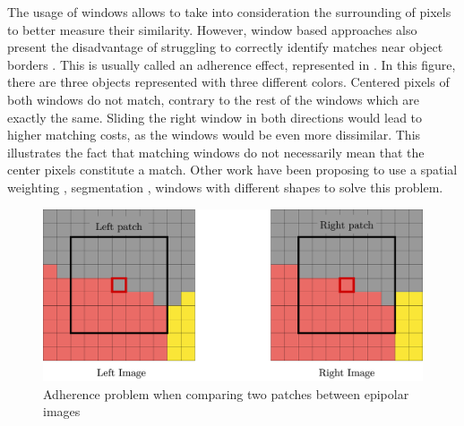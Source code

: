 The usage of windows allows to take into consideration the surrounding of pixels to better measure their similarity. However, window based approaches also present the disadvantage of struggling to correctly identify matches near object borders \cite{hirschmuller_real-time_2002}. This is usually called an adherence effect, represented in . In this figure, there are three objects represented with three different colors. Centered pixels of both windows do not match, contrary to the rest of the windows which are exactly the same. Sliding the right window in both directions would lead to higher matching costs, as the windows would be even more dissimilar. This illustrates the fact that matching windows do not necessarily mean that the center pixels constitute a match. Other work have been proposing to use a spatial weighting \cite{kuk-jin_yoon_locally_2005}, segmentation \cite{hutchison_segmentation-based_2007}, windows with different shapes \cite{ke_zhang_cross-based_2009, buades_reliable_2015} to solve this problem. 
\begin{figure}
	\centering
	\includegraphics[width=\linewidth]{Images/Chap_1/Adherence_window.png}
	\caption{Adherence problem when comparing two patches between epipolar images}
	\label{fig:adherence_window}
\end{figure}

